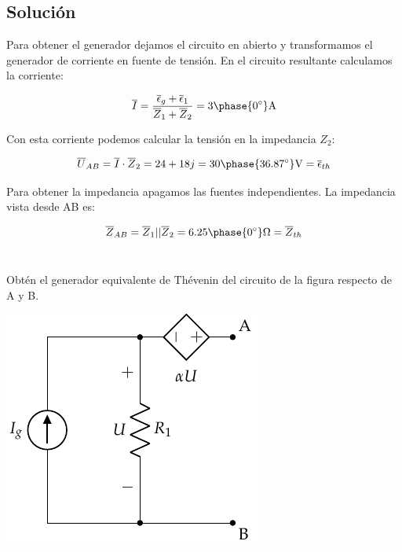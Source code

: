 \documentclass[12pt]{article}
\begin{document}
\noindent\hrulefill

\subsection*{Solución}

Para obtener el generador dejamos el circuito en abierto y transformamos el generador de corriente en fuente de tensión. En el circuito resultante calculamos la corriente:

\begin{equation*}
  \overline{I} = \frac{\overline{\epsilon}_g + \overline{\epsilon}_1}{\overline{Z}_1 + \overline{Z}_2} = 3\phase{\ang{0}}\si{\ampere} 
\end{equation*}

Con esta corriente podemos calcular la tensión en la impedancia $Z_2$:

\begin{equation*}
  \overline{U}_{AB} = \overline{I} \cdot \overline{Z}_2 = 24 + 18j = 30\phase{\ang{36.87}}\si{\volt} = \overline{\epsilon}_{th}
\end{equation*}

Para obtener la impedancia apagamos las fuentes independientes. La impedancia vista desde AB es:

\begin{equation*}
  \overline{Z}_{AB} = \overline{Z}_1 || \overline{Z}_2 = 6.25\phase{\ang{0}}\si{\ohm} = \overline{Z}_{th}
\end{equation*}


\clearpage

\section{}

Obtén el generador equivalente de Thévenin del circuito de la figura respecto de A y B.
\begin{center}
\includegraphics{../figs/Thevenin1}
\end{center}
\end{document}
